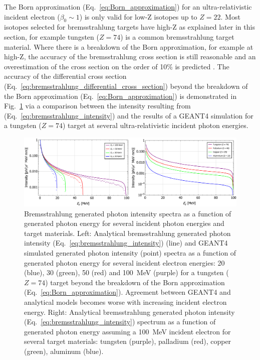 \documentclass[../main.tex]{subfiles}
\begin{document}
The Born approximation (Eq.~\ref{eq:Born_approximation}) for an ultra-relativistic incident electron ($\beta_{0}\sim 1$) is only valid for low-Z isotopes up to $Z = 22$. Most isotopes selected for bremsstrahlung targets have high-Z as explained later in this section, for example tungsten ($Z = 74$) is a common bremsstrahlung target material. Where there is a breakdown of the Born approximation, for example at high-Z, the accuracy of the bremsstrahlung cross section is still reasonable \cite{koch1959bremsstrahlung} and an overestimation of the cross section on the order of 10\% is predicted \cite{olsen1957theory}. The accuracy of the differential cross section (Eq.~\ref{eq:bremsstrahlung_differential_cross_section}) beyond the breakdown of the Born approximation (Eq.~\ref{eq:Born_approximation}) is demonstrated in Fig.~\ref{fig:BremIntensityEZ} via a comparison between the intensity resulting from (Eq.~\ref{eq:bremsstrahlung_intensity}) and the results of a \textsc{GEANT4} \cite{agostinelli2003geant4} simulation for a tungsten ($Z = 74$) target at several ultra-relativistic incident photon energies. 
\begin{figure}[!h]
\centering
\includegraphics[width=\textwidth]{Figures/DIANA_Inverse_Compton_Source_Design/BremIntensityEZ.pdf}
\caption{Bremsstrahlung generated photon intensity spectra as a function of generated photon energy for several incident photon energies and target materials. Left: Analytical bremsstrahlung generated photon intensity (Eq.~\ref{eq:bremsstrahlung_intensity}) (line) and \textsc{GEANT4} simulated generated photon intensity (point) spectra as a function of generated photon energy for several incident electron energies: 20 (blue), 30 (green), 50 (red) and 100~\si{\mega\electronvolt} (purple) for a tungsten ($Z = 74$) target beyond the breakdown of the Born approximation (Eq.~\ref{eq:Born_approximation}). Agreement between \textsc{GEANT4} and analytical models becomes worse with increasing incident electron energy. Right: Analytical bremsstrahlung generated photon intensity (Eq.~\ref{eq:bremsstrahlung_intensity}) spectrum as a function of generated photon energy assuming a 100~\si{\mega\electronvolt} incident electron for several target materials: tungsten (purple), palladium (red), copper (green), aluminum (blue).}
\label{fig:BremIntensityEZ}
\end{figure}
\end{document}
